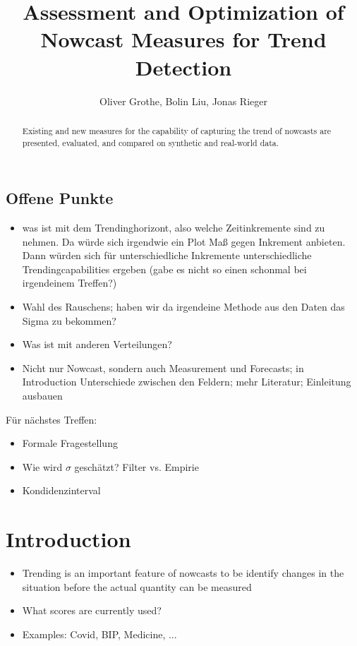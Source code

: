 \documentclass[oneside]{article}
\title{Assessment and Optimization of Nowcast Measures for Trend Detection}
\author{Oliver Grothe, Bolin Liu, Jonas Rieger}
\theoremstyle{plain}%
\theoremstyle{definition}
\begin{document}
\maketitle

\begin{abstract}
Existing and new measures for the capability of capturing the trend of nowcasts are presented, evaluated, and compared on synthetic and real-world data.
\end{abstract}

\subsection*{Offene Punkte}

\begin{itemize}
    \item was ist mit dem Trendinghorizont, also welche Zeitinkremente sind zu nehmen. Da würde sich irgendwie ein Plot Maß gegen Inkrement anbieten. Dann würden sich für unterschiedliche Inkremente unterschiedliche Trendingcapabilities ergeben (gabe es nicht so einen schonmal bei irgendeinem Treffen?)
    \item Wahl des Rauschens; haben wir da irgendeine Methode aus den Daten das Sigma zu bekommen?
    \item Was ist mit anderen Verteilungen?
    \item Nicht nur Nowcast, sondern auch Measurement und Forecasts; in Introduction Unterschiede zwischen den Feldern; mehr Literatur; Einleitung ausbauen
\end{itemize}

\listoftodos

Für nächstes Treffen:
\begin{itemize}
    \item Formale Fragestellung
    \item Wie wird $\sigma$ geschätzt? Filter vs. Empirie
    \item Kondidenzinterval 
    
\end{itemize}

\section{Introduction}

\begin{itemize}
	\item Trending is an important feature of nowcasts to be identify changes in the situation before the actual quantity can be measured
	\item What scores are currently used?
	\item Examples: Covid, BIP, Medicine, ... 
\end{itemize}
\end{document}

